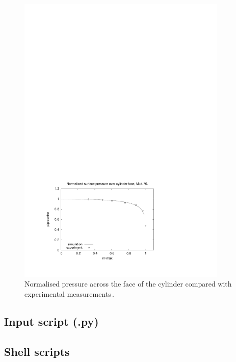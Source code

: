 \begin{figure}[htbp]
\begin{center}
\includegraphics[width=10cm,viewport=68 53 400 291,clip=true]{../2D/bar-476/bar_norm_p.pdf}
\end{center}
\caption{Normalised pressure across the face of the cylinder
         compared with experimental measurements\,\cite{kendall_1959a}.}
\label{bar-pressure-profile-fig}
\end{figure}

\newpage
\subsection{Input script (.py)}
\topbar

\bottombar

\newpage
\subsection{Shell scripts}
\label{bar-sh-files}
\topbar

\bottombar

\noindent
\topbar

\bottombar

\noindent
\topbar

\bottombar

